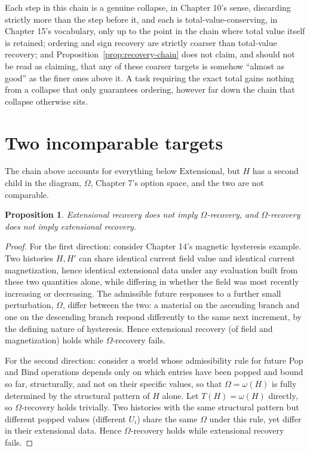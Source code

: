 \documentclass[11pt]{book}
\newtheorem{proposition}[theorem]{Proposition}
\begin{document}
Each step in this chain is a genuine collapse, in Chapter 10's sense, discarding strictly more than the step before it, and each is total-value-conserving, in Chapter 15's vocabulary, only up to the point in the chain where total value itself is retained; ordering and sign recovery are strictly coarser than total-value recovery; and Proposition~\ref{prop:recovery-chain} does not claim, and should not be read as claiming, that any of these coarser targets is somehow ``almost as good'' as the finer ones above it. A task requiring the exact total gains nothing from a collapse that only guarantees ordering, however far down the chain that collapse otherwise sits.

\section{Two incomparable targets}

The chain above accounts for everything below $\mathrm{Extensional}$, but $H$ has a second child in the diagram, $\Omega$, Chapter 7's option space, and the two are not comparable.

\begin{proposition}
\label{prop:extensional-omega-incomparable}
Extensional recovery does not imply $\Omega$-recovery, and $\Omega$-recovery does not imply extensional recovery.
\end{proposition}
\begin{proof}
For the first direction: consider Chapter 14's magnetic hysteresis example. Two histories $H,H'$ can share identical current field value and identical current magnetization, hence identical extensional data under any evaluation built from these two quantities alone, while differing in whether the field was most recently increasing or decreasing. The admissible future responses to a further small perturbation, $\Omega$, differ between the two: a material on the ascending branch and one on the descending branch respond differently to the same next increment, by the defining nature of hysteresis. Hence extensional recovery (of field and magnetization) holds while $\Omega$-recovery fails.

For the second direction: consider a world whose admissibility rule for future Pop and Bind operations depends only on which entries have been popped and bound so far, structurally, and not on their specific values, so that $\Omega=\omega(H)$ is fully determined by the structural pattern of $H$ alone. Let $T(H)=\omega(H)$ directly, so $\Omega$-recovery holds trivially. Two histories with the same structural pattern but different popped values (different $U_i$) share the same $\Omega$ under this rule, yet differ in their extensional data. Hence $\Omega$-recovery holds while extensional recovery fails.
\end{proof}
\end{document}
